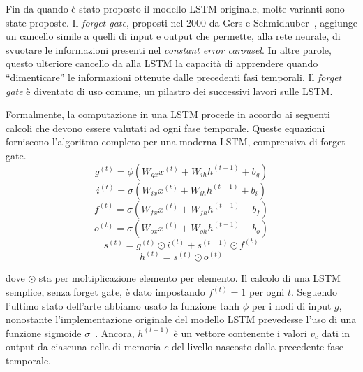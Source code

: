 Fin da quando \`e stato proposto il modello LSTM originale, molte varianti sono state proposte.
Il \emph{forget gate}, proposti nel 2000 da Gers e Schmidhuber~\cite{Gers:2000}, aggiunge un cancello simile a quelli di input e output che permette, alla rete neurale, di svuotare le informazioni presenti nel \emph{constant error carousel}.
In altre parole, questo ulteriore cancello da alla LSTM la capacit\`a di apprendere quando ``dimenticare'' le informazioni ottenute dalle precedenti fasi temporali.
Il \emph{forget gate} \`e diventato di uso comune, un pilastro dei successivi lavori sulle LSTM.

Formalmente, la computazione in una LSTM procede in accordo ai seguenti calcoli che devono essere valutati ad ogni fase temporale.
Queste equazioni forniscono l'algoritmo completo per una moderna LSTM, comprensiva di forget gate.
\begin{equation}
  g^{(t)} = \phi(W_{gx}x^{(t)} + W_{ih}h^{(t-1)} + b_g)
\end{equation}
\begin{equation}
  i^{(t)} = \sigma(W_{ix}x^{(t)} + W_{ih}h^{(t-1)} + b_i)
\end{equation}
\begin{equation}
  f^{(t)} = \sigma(W_{fx}x^{(t)} + W_{fh}h^{(t-1)} + b_f)
\end{equation}
\begin{equation}
  o^{(t)} = \sigma(W_{ox}x^{(t)} + W_{oh}h^{(t-1)} + b_o)
\end{equation}
\begin{equation}
  s^{(t)} = g^{(t)} \odot i^{(t)} + s^{(t-1)} \odot f^{(t)}
\end{equation}
\begin{equation}
  h^{(t)} = s^{(t)} \odot o^{(t)}
\end{equation}

dove $\odot$ sta per moltiplicazione elemento per elemento.
Il calcolo di una LSTM semplice, senza forget gate, \`e dato impostando $f^{(t)} = 1$ per ogni $t$.
Seguendo l'ultimo stato dell'arte abbiamo usato la funzione tanh $\phi$ per i nodi di input $g$, nonostante l'implementazione originale del modello LSTM prevedesse l'uso di una funzione sigmoide $\sigma$~\cite{Hochreiter:1997}.
Ancora, $h^{(t-1)}$ \`e un vettore contenente i valori $v_c$ dati in output da ciascuna cella di memoria $c$ del livello nascosto dalla precedente fase temporale.

